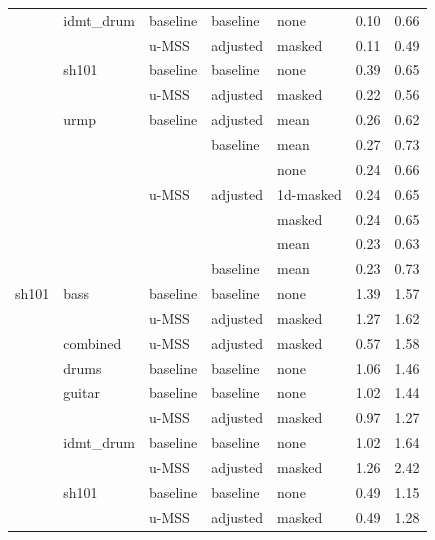 \begin{theappendices}
\begin{longtable}{lllllrr}
     & idmt\_drum & baseline & baseline & none &            0.10 &                  0.66 \\
     &      & u-MSS & adjusted & masked &            0.11 &                  0.49 \\
     & sh101 & baseline & baseline & none &            0.39 &                  0.65 \\
     &      & u-MSS & adjusted & masked &            0.22 &                  0.56 \\
     & urmp & baseline & adjusted & mean &            0.26 &                  0.62 \\
     &      &       & baseline & mean &            0.27 &                  0.73 \\
     &      &       &          & none &            0.24 &                  0.66 \\
     &      & u-MSS & adjusted & 1d-masked &            0.24 &                  0.65 \\
     &      &       &          & masked &            0.24 &                  0.65 \\
     &      &       &          & mean &            0.23 &                  0.63 \\
     &      &       & baseline & mean &            0.23 &                  0.73 \\
sh101 & bass & baseline & baseline & none &            1.39 &                  1.57 \\
     &      & u-MSS & adjusted & masked &            1.27 &                  1.62 \\
     & combined & u-MSS & adjusted & masked &            0.57 &                  1.58 \\
     & drums & baseline & baseline & none &            1.06 &                  1.46 \\
     & guitar & baseline & baseline & none &            1.02 &                  1.44 \\
     &      & u-MSS & adjusted & masked &            0.97 &                  1.27 \\
     & idmt\_drum & baseline & baseline & none &            1.02 &                  1.64 \\
     &      & u-MSS & adjusted & masked &            1.26 &                  2.42 \\
     & sh101 & baseline & baseline & none &            0.49 &                  1.15 \\
     &      & u-MSS & adjusted & masked &            0.49 &                  1.28 \\

\end{longtable}
\end{theappendices}
